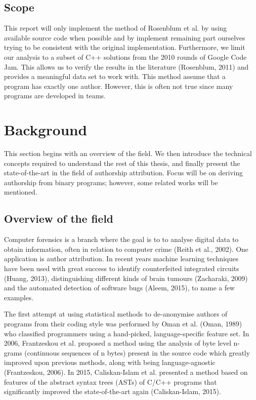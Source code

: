 \documentclass[a4paper,11pt]{kth-mag}
\begin{document}
\section{Scope}
This report will only implement the method of Rosenblum et al. by using
available source code when possible and by implement remaining part ourselves
trying to be consistent with the original implementation.  Furthermore, we
limit our analysis to a subset of C++ solutions from the 2010 rounds of Google
Code Jam. This allows us to verify the results in the literature (Rosenblum,
2011) and provides a meaningful data set to work with. This method assume that
a program has exactly one author. However, this is often not true since many
programs are developed in teams.

\chapter{Background}
This section begins with an overview of the field. We then introduce the
technical concepts required to understand the rest of this thesis, and finally
present the state-of-the-art in the field of authorship attribution. Focus will
be on deriving authorship from binary programs; however, some related works
will be mentioned.

\section{Overview of the field}
Computer forensics is a branch where the goal is to to analyse digital data to
obtain information, often in relation to computer crime (Reith et al., 2002).
One application is author attribution. In recent years machine learning
techniques have been used with great success to identify counterfeited
integrated circuits (Huang, 2013), distinguishing different kinds of brain
tumours (Zacharaki, 2009) and the automated detection of software bugs (Aleem,
2015), to name a few examples.

The first attempt at using statistical methods to de-anonymise authors of
programs from their coding style was performed by Oman et al. (Oman, 1989) who
classified programmers using a hand-picked, language-specific feature set. In
2006, Frantzeskou et al. proposed a method using the analysis of byte level
n-grams (continuous sequences of n bytes) present in the source code which
greatly improved upon previous methods, along with being language-agnostic
(Frantzeskou, 2006). In 2015, Caliskan-Islam et al. presented a method based on
features of the abstract syntax trees (ASTs) of C/C++ programs that
significantly improved the state-of-the-art again (Caliskan-Islam, 2015).
 
\end{document}
